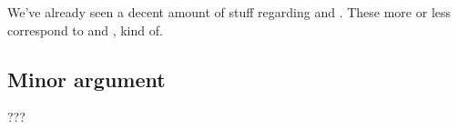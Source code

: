 We've already seen a decent amount of stuff regarding \ESU{} and \EAS{}.
These more or less correspond to \AR{} and \WR{}, kind of.

\subsection{Minor argument}
\label{sec:minor-argument}

???








